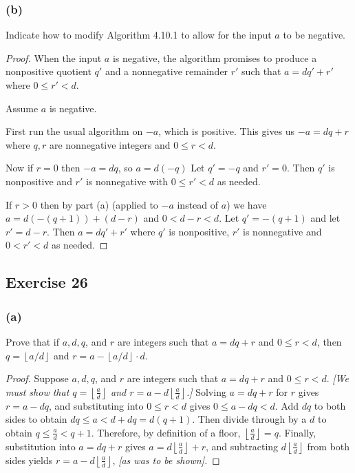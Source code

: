 \documentclass[14pt]{extarticle}
\newcommand{\floor}[1]{{\left\lfloor#1\right\rfloor}}
\begin{document}
\subsubsection{(b)}
Indicate how to modify Algorithm 4.10.1 to allow for the input $a$ to be negative.

\begin{proof}
When the input $a$ is negative, the algorithm promises to produce a nonpositive quotient $q'$ and a nonnegative remainder $r'$ such that $a = dq' + r'$ where $0 \leq r' < d$.

Assume $a$ is negative.

First run the usual algorithm on $-a$, which is positive. This gives us $-a = dq + r$ where $q,r$ are nonnegative integers and $0 \leq r < d$. 

Now if $r = 0$ then $-a = dq$, so $a = d(-q)$ Let $q' = -q$ and $r' = 0$. Then $q'$ is nonpositive and $r'$ is nonnegative with $0 \leq r' < d$ as needed.

If $r > 0$ then by part (a) (applied to $-a$ instead of $a$) we have $a = d(-(q + 1)) + (d - r)$ and $0 < d - r < d$. Let $q' = -(q+1)$ and let $r' = d-r$. Then $a = dq' + r'$ where $q'$ is nonpositive, $r'$ is nonnegative and $0 < r' < d$ as needed.
\end{proof}

\subsection{Exercise 26}
\subsubsection{(a)}
Prove that if $a, d, q$, and $r$ are integers such that $a = dq + r$ and $0 \leq r < d$, then $q = \floor{a/d}$ and $r = a - \floor{a/d} \cdot d$.

\begin{proof}
Suppose $a, d, q$, and $r$ are integers such that $a = dq + r$ and $0 \leq r < d$. {\it [We must show that $q = \floor{\frac{a}{d}}$ and $r = a - d\floor{\frac{a}{d}}$.]} Solving $a = dq + r$ for $r$ gives $r = a - dq$, and substituting into $0 \leq r < d$ gives $0 \leq a - dq < d$. Add $dq$ to both sides to obtain $dq \leq a < d + dq = d(q + 1)$. Then divide through by a $d$ to obtain $q \leq \frac{a}{d} < q + 1$. Therefore, by definition of a floor, $\floor{\frac{a}{d}} = q$. Finally, substitution into $a = dq + r$ gives $a = d \floor{\frac{a}{d}} + r$, and subtracting $d\floor{\frac{a}{d}}$ from both sides yields $r = a - d\floor{\frac{a}{d}}$, {\it [as was to be shown].}
\end{proof}
\end{document}
